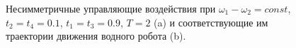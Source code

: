 

\begin{figure}[!ht]
	\begin{minipage}[h]{0.5\linewidth}
	\end{minipage}
	\hfill
	\begin{minipage}[h]{0.5\linewidth}
	\end{minipage}
	\caption{Несимметричные управляющие воздействия при $\omega_1 - \omega_2 = const$, $t_2 = t_4 = 0.1$, $t_1 = t_3 = 0.9$, $T = 2$ (a) и соответствующие им траектории движения водного робота (b).}
	\label{DifferentAmp}
\end{figure}

